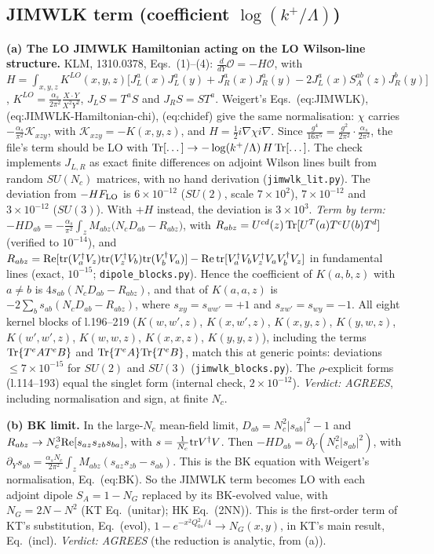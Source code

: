 \subsection{JIMWLK term (coefficient $\log(k^+/\Lambda)$)}
\textbf{(a) The LO JIMWLK Hamiltonian acting on the LO Wilson-line structure.} KLM, 1310.0378, Eqs.~(1)--(4):
$\frac{d}{dY}\mathcal O=-H\mathcal O$, with
$H=\int_{x,y,z}K^{LO}(x,y,z)\big[J^a_L(x)J^a_L(y)+J^a_R(x)J^a_R(y)-2J^a_L(x)S^{ab}_A(z)J^b_R(y)\big]$, $K^{LO}=\frac{\alpha_s}{2\pi^2}\frac{X\cdot Y}{X^2Y^2}$, $J_LS=T^aS$ and $J_RS=ST^a$. Weigert's Eqs.~(eq:JIMWLK), (eq:JIMWLK-Hamiltonian-chi), (eq:chidef) give the same normalisation: $\chi$ carries $-\frac{\alpha_s}{\pi^2}\mathcal K_{xzy}$, with $\mathcal K_{xzy}=-K(x,y,z)$, and $H=\frac12 i\nabla\chi i\nabla$.
Since $\frac{g^4}{16\pi^5}=\frac{g^2}{2\pi^2}\cdot\frac{\alpha_s}{2\pi^2}$, the file's term should be LO with ${\rm Tr}[\dots]\to-\log(k^+/\Lambda)\,H\,{\rm Tr}[\dots]$. The check implements $J_{L,R}$ as exact finite differences on adjoint Wilson lines built from random $SU(N_c)$ matrices, with no hand derivation (\texttt{jimwlk\_lit.py}). The deviation from $-HF_{\rm LO}$ is $6\times10^{-12}$ ($SU(2)$, scale $7\times10^2$), $7\times10^{-12}$ and $3\times10^{-12}$ ($SU(3)$). With $+H$ instead, the deviation is $3\times10^3$.
\emph{Term by term:} $-HD_{ab}=-\frac{\alpha_s}{\pi^2}\int_zM_{abz}\big(N_cD_{ab}-R_{abz}\big)$, with $R_{abz}=U^{cd}(z)\,{\rm Tr}[U^T(a)T^cU(b)T^d]$ (verified to $10^{-14}$), and
$R_{abz}={\rm Re}[{\rm tr}(V_a^\dagger V_z){\rm tr}(V_z^\dagger V_b){\rm tr}(V_b^\dagger V_a)]-{\rm Re}\,{\rm tr}[V_a^\dagger V_bV_z^\dagger V_aV_b^\dagger V_z]$ in fundamental lines (exact, $10^{-15}$; \texttt{dipole\_blocks.py}). Hence the coefficient of $K(a,b,z)$ with $a\neq b$ is $4s_{ab}(N_cD_{ab}-R_{abz})$, and that of $K(a,a,z)$ is $-2\sum_b s_{ab}(N_cD_{ab}-R_{abz})$, where $s_{xy}=s_{ww'}=+1$ and $s_{xw'}=s_{wy}=-1$. All eight kernel blocks of l.196--219 ($K(w,w',z)$, $K(x,w',z)$, $K(x,y,z)$, $K(y,w,z)$, $K(w',w',z)$, $K(w,w,z)$, $K(x,x,z)$, $K(y,y,z)$), including the terms ${\rm Tr}\{T^eAT^eB\}$ and ${\rm Tr}\{T^eA\}{\rm Tr}\{T^eB\}$, match this at generic points: deviations $\le7\times10^{-15}$ for $SU(2)$ and $SU(3)$ (\texttt{jimwlk\_blocks.py}). The $\rho$-explicit forms (l.114--193) equal the singlet form (internal check, $2\times10^{-12}$).
\emph{Verdict: AGREES}, including normalisation and sign, at finite $N_c$.

\medskip\noindent\textbf{(b) BK limit.} In the large-$N_c$ mean-field limit, $D_{ab}=N_c^2|s_{ab}|^2-1$ and $R_{abz}\to N_c^3{\rm Re}[s_{az}s_{zb}s_{ba}]$, with $s=\frac{1}{N_c}{\rm tr}V^\dagger V$. Then $-HD_{ab}=\partial_Y(N_c^2|s_{ab}|^2)$, with
$\partial_Ys_{ab}=\frac{\alpha_sN_c}{2\pi^2}\int_zM_{abz}(s_{az}s_{zb}-s_{ab})$. This is the BK equation with Weigert's normalisation, Eq.~(eq:BK). So the JIMWLK term becomes LO with each adjoint dipole $S_A=1-N_G$ replaced by its BK-evolved value, with $N_G=2N-N^2$ (KT Eq.~(unitar); HK Eq.~(2NN)). This is the first-order term of KT's substitution, Eq.~(evol), $1-e^{-x^2Q_{0s}^2/4}\to N_G(x,y)$, in KT's main result, Eq.~(incl). \emph{Verdict: AGREES} (the reduction is analytic, from (a)).


